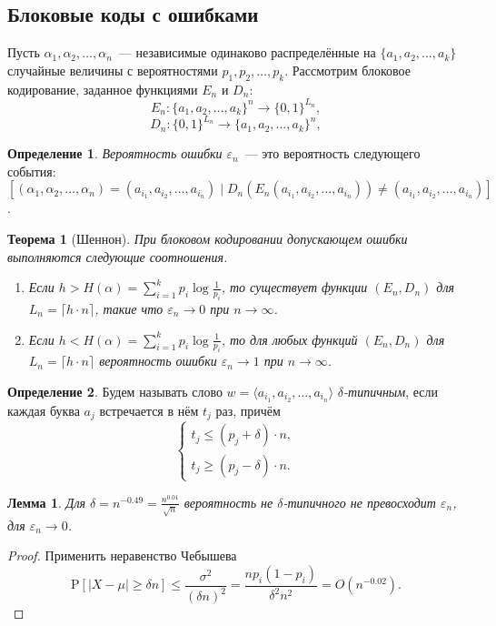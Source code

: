 \documentclass[12pt]{article}
\newcommand{\seqn}[2]{{#1}_1,{#1}_2,\dotsc,{#1}_{#2}}
\newcommand{\seqin}[3]{{#1}_{{#2}_1},{#1}_{{#2}_2},\dotsc,{#1}_{{#2}_{#3}}}
\theoremstyle{definition}
\newtheorem{definition}{Определение}
\theoremstyle{plain}
\newtheorem{theorem}{Теорема}[section]
\newtheorem{lemma}{Лемма}[section]
\theoremstyle{remark}
\begin{document}
\subsection{Блоковые коды с ошибками}
Пусть $\seqn{\alpha}{n}$~--- независимые одинаково распределённые на
$\{\seqn{a}{k}\}$ случайные величины с вероятностями $\seqn{p}{k}$.
Рассмотрим блоковое кодирование, заданное функциями $E_n$ и $D_n$:
\[
    E_n:\{\seqn{a}{k}\}^n \to \{0,1\}^{L_n},
\]
\[
    D_n:\{0,1\}^{L_n} \to \{\seqn{a}{k}\}^n ,
\]
\begin{definition}
    \emph{Вероятность ошибки $\varepsilon_n$}~--- это вероятность следующего
    события: $[(\seqn{\alpha}{n}) = (\seqin{a}{i}{n}) \mid
    D_n(E_n(\seqin{a}{i}{n}))\neq (\seqin{a}{i}{n})]$.
\end{definition}
\begin{theorem}[Шеннон]\label{thm:blockcoding}
    При блоковом кодировании допускающем ошибки выполняются следующие
    соотношения.
    \begin{enumerate}
        \item Если $h > H(\alpha) = \sum_{i=1}^{k} p_i\log\frac{1}{p_i}$, то
            существует функции $(E_n, D_n)$ для $L_n = \lceil h\cdot n \rceil$,
            такие что $\varepsilon_n\to0$ при $n\to\infty$.

        \item Если $h < H(\alpha) = \sum_{i=1}^{k} p_i\log\frac{1}{p_i}$, то
            для любых функций $(E_n, D_n)$ для $L_n = \lceil h\cdot n \rceil$
            вероятность ошибки $\varepsilon_n\to1$ при $n\to\infty$.
    \end{enumerate}
\end{theorem}
\begin{definition}
    Будем называть слово $w=\langle\seqin{a}{i}{n}\rangle$ \emph{$\delta$-типичным}, если
    каждая буква $a_j$ встречается в нём $t_j$ раз, причём
    \[
    \begin{cases}
        t_j\le (p_j + \delta)\cdot n,\\
        t_j\ge (p_j - \delta)\cdot n.
    \end{cases}
    \]
\end{definition}
\begin{lemma}\label{lm:typicalwordprob}
    Для $\delta = n^{-0.49} = \frac{n^{0.01}}{\sqrt n}$ вероятность не
    $\delta$-типичного не превосходит $\varepsilon_n$, для $\varepsilon_n\to 0$.
\end{lemma}
\begin{proof}
    Применить неравенство Чебышева
    \[
    \mathrm {P}[|X-\mu |\ge \delta n]\le \frac {\sigma^2}{(\delta n)^2} =
    \frac{np_i(1-p_i)}{\delta^2 n^2} = O(n^{-0.02}). 
    \]
\end{proof}
\end{document}
